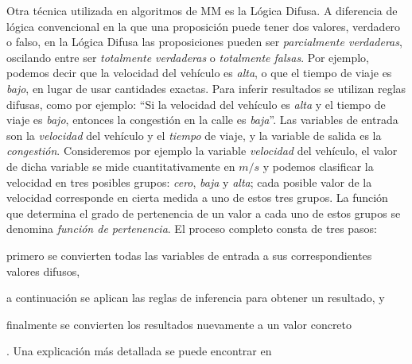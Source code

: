 Otra técnica utilizada en algoritmos de MM es la Lógica Difusa. A diferencia de lógica convencional en la que una proposición puede tener dos valores, verdadero o falso, en la Lógica Difusa las proposiciones pueden ser \emph{parcialmente verdaderas}, oscilando entre ser \emph{totalmente verdaderas} o \emph{totalmente falsas}. Por ejemplo, podemos decir que la velocidad del vehículo es \emph{alta}, o que el tiempo de viaje es \emph{bajo}, en lugar de usar cantidades exactas. Para inferir resultados se utilizan reglas difusas, como por ejemplo: “Si la velocidad del vehículo es \emph{alta} y el tiempo de viaje es \emph{bajo}, entonces la congestión en la calle es \emph{baja}”. Las variables de entrada son la \emph{velocidad} del vehículo y el \emph{tiempo} de viaje, y la variable de salida es la \emph{congestión}. Consideremos por ejemplo la variable \emph{velocidad} del vehículo, el valor de dicha variable se mide cuantitativamente en $m/s$ y podemos clasificar la velocidad en tres posibles grupos: \emph{cero}, \emph{baja} y \emph{alta}; cada posible valor de la velocidad corresponde en cierta medida a uno de estos tres grupos. La función que determina el grado de pertenencia de un valor a cada uno de estos grupos se denomina \emph{función de pertenencia}. El proceso completo consta de tres pasos: \begin{enumerate*}[1)]
\item primero se convierten todas las variables de entrada a sus correspondientes valores difusos, 
\item a continuación se aplican las reglas de inferencia para obtener un resultado, y
\item finalmente se convierten los resultados nuevamente a un valor concreto
\end{enumerate*}. Una explicación más detallada se puede encontrar en \cite{zadeh1988fuzzy}

